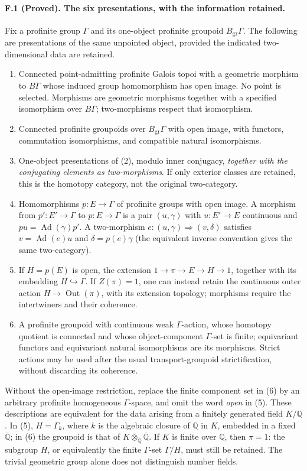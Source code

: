 \paragraph{F.1 (Proved). The six presentations, with the information retained.}
Fix a profinite group $\Gamma$ and its one-object profinite groupoid
$B_{\mathrm{gr}}\Gamma$. The following are presentations of the same
unpointed object, provided the indicated two-dimensional data are retained.
\begin{enumerate}
\item Connected point-admitting profinite Galois topoi with a geometric morphism to
$B\Gamma$ whose induced group homomorphism has open image. No point is
selected. Morphisms are geometric morphisms together with a specified
isomorphism over $B\Gamma$; two-morphisms respect that isomorphism.
\item Connected profinite groupoids over $B_{\mathrm{gr}}\Gamma$ with open image, with functors,
commutation isomorphisms, and compatible natural isomorphisms.
\item One-object presentations of (2), modulo inner conjugacy, \emph{together
with the conjugating elements as two-morphisms}. If only exterior classes
are retained, this is the homotopy category, not the original two-category.
\item Homomorphisms $p:E\to\Gamma$ of profinite groups with open image. A morphism from
$p':E'\to\Gamma$ to $p:E\to\Gamma$ is a pair $(u,\gamma)$ with
$u:E'\to E$ continuous and $p u=\operatorname{Ad}(\gamma)p'$.
A two-morphism $e:(u,\gamma)\Rightarrow(v,\delta)$ satisfies
$v=\operatorname{Ad}(e)u$ and $\delta=p(e)\gamma$ (the equivalent inverse
convention gives the same two-category).
\item If $H=p(E)$ is open, the extension $1\to\pi\to E\to H\to1$, together
with its embedding $H\hookrightarrow\Gamma$. If $Z(\pi)=1$, one can instead
retain the continuous outer action $H\to\operatorname{Out}(\pi)$, with its
extension topology; morphisms require the intertwiners and their coherence.
\item A profinite groupoid with continuous weak $\Gamma$-action, whose
homotopy quotient is connected and whose object-component $\Gamma$-set is
finite; equivariant functors and equivariant natural isomorphisms are its
morphisms. Strict actions may be used after the usual transport-groupoid
strictification, without discarding its coherence.
\end{enumerate}
Without the open-image restriction, replace the finite component set in (6)
by an arbitrary profinite homogeneous $\Gamma$-space, and omit the word \emph{open} in (5).
These descriptions are equivalent for the data arising from a finitely
generated field $K/\mathbb Q$. In (5), $H=\Gamma_k$, where $k$ is the
algebraic closure of $\mathbb Q$ in $K$, embedded in a fixed
$\overline{\mathbb Q}$; in (6) the groupoid is that of
$K\otimes_{\mathbb Q}\overline{\mathbb Q}$. If $K$ is finite over
$\mathbb Q$, then $\pi=1$: the subgroup $H$, or equivalently the finite
$\Gamma$-set $\Gamma/H$, must still be retained. The trivial geometric group
alone does not distinguish number fields.

